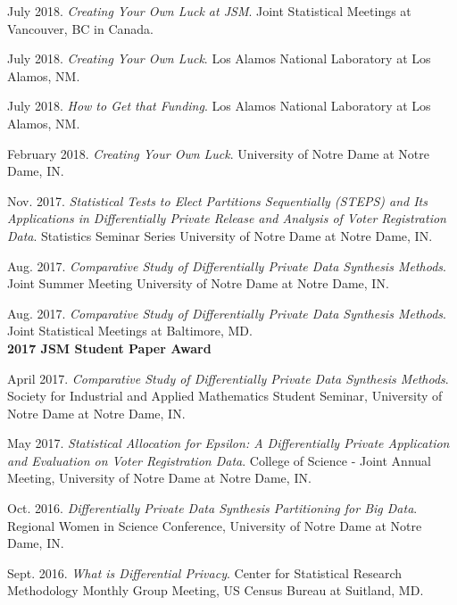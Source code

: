 \documentclass[11pt, letterpaper, roman]{moderncv} %
\begin{document}
\begin{etaremune}[topsep=0pt, itemsep=6pt, partopsep=0pt, parsep=0pt]
  \item July 2018. \textit{Creating Your Own Luck at JSM}. Joint Statistical Meetings at Vancouver, BC in Canada.
  
  \item July 2018. \textit{Creating Your Own Luck}. Los Alamos National Laboratory at Los Alamos, NM.
  
  \item July 2018. \textit{How to Get that Funding}. Los Alamos National Laboratory at Los Alamos, NM.
  
  \item February 2018. \textit{Creating Your Own Luck}. University of Notre Dame at Notre Dame, IN.
  
  \item Nov. 2017. \textit{Statistical Tests to Elect Partitions Sequentially (STEPS) and Its Applications in Differentially Private Release and Analysis of Voter Registration Data}. Statistics Seminar Series University of Notre Dame at Notre Dame, IN.
  
  \item Aug. 2017. \textit{Comparative Study of Differentially Private Data Synthesis Methods}. Joint Summer Meeting University of Notre Dame at Notre Dame, IN.

  \item Aug. 2017. \textit{Comparative Study of Differentially Private Data Synthesis Methods}. Joint Statistical Meetings at Baltimore, MD.\\
  \textbf{2017 JSM Student Paper Award}
  
   \item April 2017. \textit{Comparative Study of Differentially Private Data Synthesis Methods}. Society for Industrial and Applied Mathematics Student Seminar, University of Notre Dame at Notre Dame, IN.
  
  \item May 2017. \textit{Statistical Allocation for Epsilon: A Differentially Private Application and Evaluation on Voter Registration Data}. College of Science - Joint Annual Meeting, University of Notre Dame at Notre Dame, IN.

  \item Oct. 2016. \textit{Differentially Private Data Synthesis Partitioning for Big Data}. Regional Women in Science Conference, University of Notre Dame at Notre Dame, IN. 

  \item Sept. 2016. \textit{What is Differential Privacy}. Center for Statistical Research Methodology Monthly Group Meeting, US Census Bureau at Suitland, MD. 


\end{etaremune}
\end{document}
